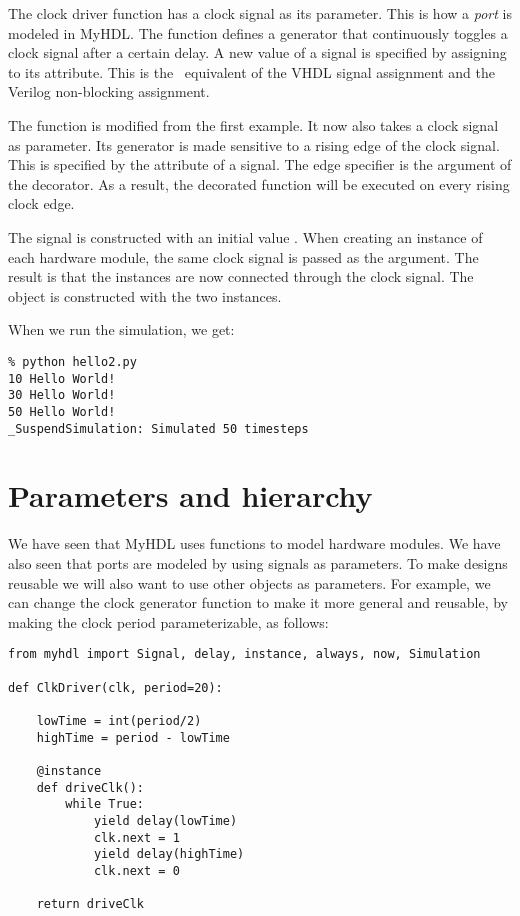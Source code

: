 The clock driver function  has a
clock signal as its parameter. This is how a
\emph{port} is modeled in MyHDL. The function
defines a generator
that continuously toggles a clock signal after a certain delay.
A new value of a signal is specified by assigning to its
 attribute. This is the \myhdl\ equivalent of 
the VHDL signal assignment and the 
Verilog non-blocking assignment.

The  function is modified from the
first example. It now also takes a clock signal as parameter.
Its generator is made sensitive to a rising
edge of the clock signal. This is specified by the
 attribute of a signal. The edge
specifier is the argument of the 
decorator. As a result, the decorated function
will be executed on every rising clock edge.

The  signal is constructed with an initial value
. When creating an instance of each 
hardware module, the same clock signal is passed as
the argument. The result is that the instances
are now connected through the clock signal.
The  object is constructed with the
two instances.

When we run the simulation, we get:

\begin{verbatim}
% python hello2.py
10 Hello World!
30 Hello World!
50 Hello World!
_SuspendSimulation: Simulated 50 timesteps
\end{verbatim}


\section{Parameters and hierarchy \label{intro-hier}}

We have seen that MyHDL uses functions to model hardware
modules. We have also seen that ports are modeled by using
signals as parameters. To make designs reusable we will also
want to use other objects as parameters. For example, we can
change the clock generator function to make it more general
and reusable, by making the clock period parameterizable, as
follows:

\begin{verbatim}
from myhdl import Signal, delay, instance, always, now, Simulation

def ClkDriver(clk, period=20):
    
    lowTime = int(period/2)
    highTime = period - lowTime

    @instance
    def driveClk():
        while True:
            yield delay(lowTime)
            clk.next = 1
            yield delay(highTime)
            clk.next = 0

    return driveClk
\end{verbatim}


